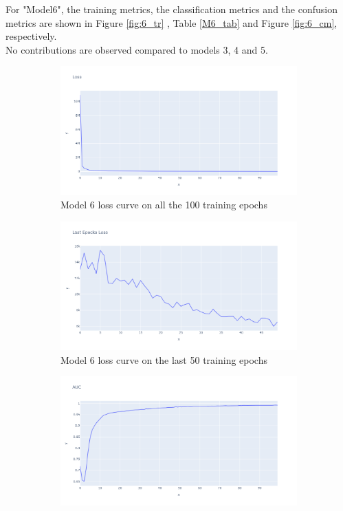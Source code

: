   For "Model6", the training metrics, the classification metrics and the confusion metrics are shown in Figure \ref{fig:6_tr} , Table \ref{M6_tab} and Figure \ref{fig:6_cm}, respectively.\\ No contributions are observed compared to models 3, 4 and 5. 
\begin{figure}[H]%
    \centering
    \begin{subfigure}{0.49\textwidth}
        \centering
        \includegraphics[width=\linewidth]{figures/ev/do_2_tloss.png}
        \caption{Model 6 loss curve on all the 100 training epochs}
    \label{fig:do_2_tloss}
    \end{subfigure}
    \begin{subfigure}{0.49\textwidth}
        \centering
         \includegraphics[width=\linewidth]{figures/ev/do_2_ploss.png}
        \caption{Model 6 loss curve on the last 50 training epochs}
    \label{fig:do_2_ploss}
    \end{subfigure}
    \begin{subfigure}{0.49\textwidth}
        \centering
        \includegraphics[width=\linewidth]{figures/ev/do_2_auc.png}

\end{subfigure}
\end{figure}
